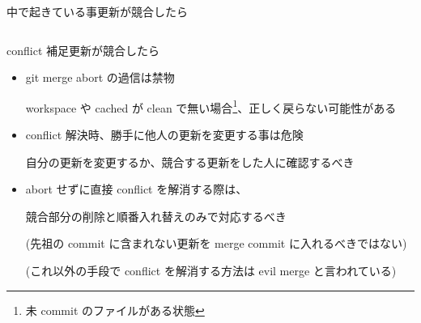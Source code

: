 \begin{frame}[t]{中で起きている事}{更新が競合したら}
\begin{columns}
\begin{widecolumn}
    \end{widecolumn}

  \end{columns}
  \vspace{2ex}





\end{frame}


\begin{frame}[t]{conflict 補足}{更新が競合したら}

  \begin{itemize}
  \item git merge {\dhyphen}abort の過信は禁物

    workspace や cached が clean で無い場合\footnote{未 commit のファイルがある状態}、正しく戻らない可能性がある
    \vspace{2ex}

  \item conflict 解決時、勝手に他人の更新を変更する事は危険

    自分の更新を変更するか、競合する更新をした人に確認するべき
    \vspace{2ex}

  \item abort せずに直接 conflict を解消する際は、

    競合部分の削除と順番入れ替えのみで対応するべき

    (先祖の commit に含まれない更新を merge commit に入れるべきではない)

    (これ以外の手段で conflict を解消する方法は evil merge と言われている)
  \end{itemize}

\end{frame}
